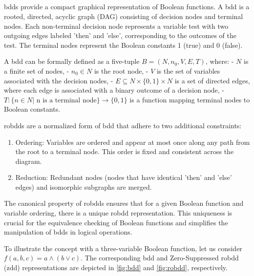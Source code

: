 \subsection{\color{blue}{Decision Diagrams}}

\subsubsection{\color{blue}{Binary Decision Diagrams}}
\acrfull{bdd}s provide a compact graphical representation of Boolean functions. A \acrshort{bdd} is a rooted, directed, acyclic graph (DAG) consisting of decision nodes and terminal nodes. Each non-terminal decision node represents a variable test with two outgoing edges labeled 'then' and 'else', corresponding to the outcomes of the test. The terminal nodes represent the Boolean constants 1 (true) and 0 (false).

A \acrshort{bdd} can be formally defined as a five-tuple $B = (N, n_0, V, E, T)$, where:
- $N$ is a finite set of nodes,
- $n_0 \in N$ is the root node,
- $V$ is the set of variables associated with the decision nodes,
- $E \subseteq N \times \{0, 1\} \times N$ is a set of directed edges, where each edge is associated with a binary outcome of a decision node,
- $T: \{n \in N | \text{ n is a terminal node}\} \rightarrow \{0, 1\}$ is a function mapping terminal nodes to Boolean constants.

\acrfull{robdd}s are a normalized form of \acrshort{bdd} that adhere to two additional constraints:
\begin{enumerate}
    \item {Ordering: Variables are ordered and appear at most once along any path from the root to a terminal node. This order is fixed and consistent across the diagram.}
    \item {Reduction: Redundant nodes (nodes that have identical 'then' and 'else' edges) and isomorphic subgraphs are merged.}
\end{enumerate}

The canonical property of \acrshort{robdd}s ensures that for a given Boolean function and variable ordering, there is a unique \acrshort{robdd} representation. This uniqueness is crucial for the equivalence checking of Boolean functions and simplifies the manipulation of \acrshort{bdd}s in logical operations.

To illustrate the concept with a three-variable Boolean function, let us consider $f(a, b, c) = a \land (b \lor c)$. The corresponding \acrshort{bdd} and Zero-Suppressed \acrshort{robdd} (\acrshort{zdd}) representations are depicted in \ref{fig:bdd} and \ref{fig:robdd}, respectively.

